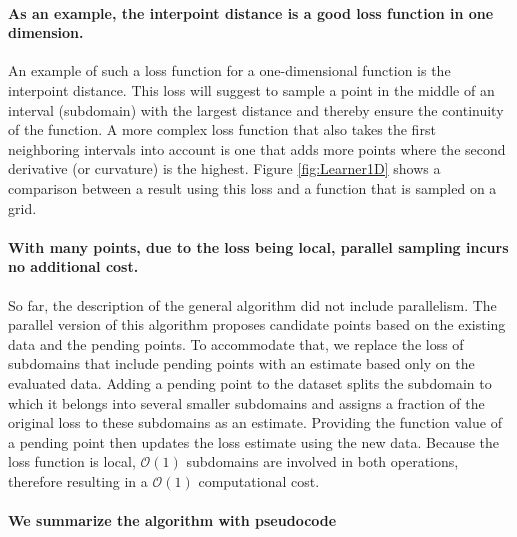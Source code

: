 \documentclass[english, twocolumn, 10pt, aps, superscriptaddress, floatfix, prb, citeautoscript]{revtex4-1}
\begin{document}
\hypertarget{as-an-example-the-interpoint-distance-is-a-good-loss-function-in-one-dimension.}{%
\paragraph{As an example, the interpoint distance is a good loss function in one dimension.}\label{as-an-example-the-interpoint-distance-is-a-good-loss-function-in-one-dimension.}}

An example of such a loss function for a one-dimensional function is the interpoint distance.
This loss will suggest to sample a point in the middle of an interval (subdomain) with the largest distance and thereby ensure the continuity of the function.
A more complex loss function that also takes the first neighboring intervals into account is one that adds more points where the second derivative (or curvature) is the highest.
Figure \ref{fig:Learner1D} shows a comparison between a result using this loss and a function that is sampled on a grid.

\hypertarget{with-many-points-due-to-the-loss-being-local-parallel-sampling-incurs-no-additional-cost.}{%
\paragraph{With many points, due to the loss being local, parallel sampling incurs no additional cost.}\label{with-many-points-due-to-the-loss-being-local-parallel-sampling-incurs-no-additional-cost.}}

So far, the description of the general algorithm did not include parallelism.
The parallel version of this algorithm proposes candidate points based on the existing data and the pending points.
To accommodate that, we replace the loss of subdomains that include pending points with an estimate based only on the evaluated data.
Adding a pending point to the dataset splits the subdomain to which it belongs into several smaller subdomains and assigns a fraction of the original loss to these subdomains as an estimate.
Providing the function value of a pending point then updates the loss estimate using the new data.
Because the loss function is local, \(\mathcal{O}(1)\) subdomains are involved in both operations, therefore resulting in a \(\mathcal{O}(1)\) computational cost.

\hypertarget{we-summarize-the-algorithm-with-pseudocode}{%
\paragraph{We summarize the algorithm with pseudocode}\label{we-summarize-the-algorithm-with-pseudocode}}
\end{document}
